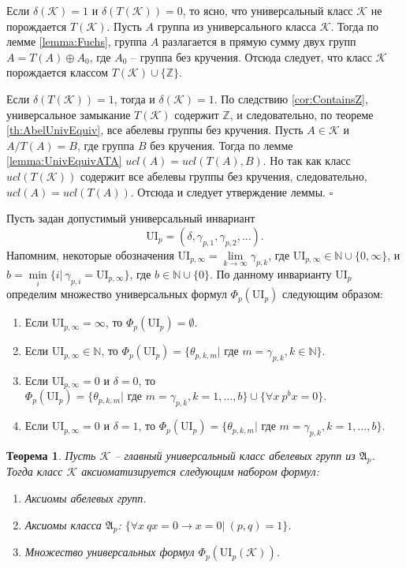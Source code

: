 \documentclass[a4paper,11pt,twoside]{article}
\newtheorem{theorem}{Теорема}[section]
\def\proof{{\noindent{\bf Доказательство.}} }
\def\A{{\mathfrak{A}}}
\def\K{{\mathcal{K}}}
\def\Z{{\mathbb{Z}}}
\def\N{{\mathbb{N}}}
\def\ui{{\mathrm{UI}}}
\begin{document}
\proof Если $\delta(\K) = 1$ и $\delta(T(\K)) = 0$, то ясно, что универсальный класс $\K$ не порождается $T(\K)$. Пусть $A$ группа из универсального класса $\K$. Тогда по лемме \ref{lemma:Fuchs}, группа $A$ разлагается в прямую сумму двух групп $A = T(A) \oplus A_0$, где $A_0$ -- группа без кручения. Отсюда следует, что класс $\K$ порождается классом $T(\K) \cup \{\Z\}.$

Если $\delta(T(\K)) = 1$, тогда и $\delta(\K) = 1$. По следствию \ref{cor:ContainsZ}, универсальное замыкание $T(\K)$ содержит $\Z$, и следовательно, по теореме \ref{th:AbelUnivEquiv}, все абелевы группы без кручения. Пусть $A \in \K$ и $A \big/ T(A) = B$, где группа $B$ без кручения. Тогда по лемме \ref{lemma:UnivEquivATA} $ucl(A) = ucl(T(A), B).$ Но так как класс $ucl(T(\K))$ содержит все абелевы группы без кручения, следовательно, $ucl(A) = ucl(T(A))$. Отсюда и следует утверждение леммы. $\square$


Пусть задан допустимый универсальный инвариант 
$$\ui_p = (\delta, \gamma_{p,1}, \gamma_{p,2}, \ldots).$$ 
Напомним, некоторые обозначения $\ui_{p,\infty} = \lim\limits_{k \rightarrow \infty} \gamma_{p,k}$, где $\ui_{p,\infty} \in \N \cup \{0, \infty\}$, и $b = \min\limits_{i}\{i | \ \gamma_{p,i} = \ui_{p, \infty}\}$, где $b \in \N \cup \{0\}$. По данному инварианту $\ui_p$ определим множество универсальных формул $\Phi_p(\ui_p)$ следующим образом:
\begin{enumerate}
\item Если $\ui_{p,\infty} = \infty$, то $\Phi_p(\ui_p) = \emptyset.$
\item Если $\ui_{p, \infty} \in \N$, то $\Phi_p(\ui_p) = \{\theta_{p,k,m} | \text{ где } m = \gamma_{p,k}, k \in \N\}.$
\item Если $\ui_{p, \infty} = 0$ и $\delta = 0$, то $\Phi_p(\ui_p) = \{\theta_{p,k,m} | \text{ где } m = \gamma_{p,k}, k = 1,\ldots,b\} \cup \{\forall x \ p^b x = 0\}.$
\item Если $\ui_{p, \infty} = 0$ и $\delta = 1$, то $\Phi_p(\ui_p) = \{\theta_{p,k,m} | \text{ где } m = \gamma_{p,k}, k = 1, \ldots, b\}.$
\end{enumerate}


\begin{theorem}\label{th:AxiomsOfKAp}
Пусть $\K$ -- главный универсальный класс абелевых групп из $\A_p$. Тогда класс $\K$ аксиоматизируется следующим набором формул:
\begin{enumerate}
\item Аксиомы абелевых групп.
\item Аксиомы класса $\A_p$: $\{ \forall x \ qx = 0 \rightarrow x = 0 | \ (p,q) = 1 \}$.
\item Множество универсальных формул $\Phi_p(\ui_p(\K))$.
\end{enumerate}
\end{theorem}
\end{document}
